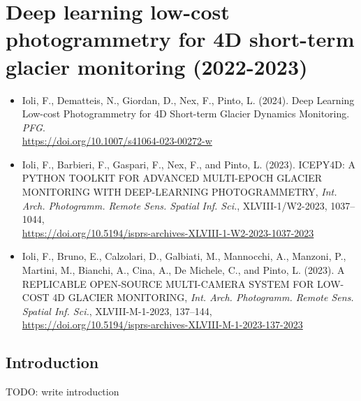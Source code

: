 \graphicspath{{figures/chapter4/}}
\onehalfspacing

\chapter{Deep learning low-cost photogrammetry for 4D short-term glacier monitoring
  (2022-2023)}

\vfill


\begin{itemize}
  \item Ioli, F., Dematteis, N., Giordan, D., Nex, F., Pinto, L. (2024). Deep Learning Low-cost Photogrammetry for 4D Short-term Glacier Dynamics Monitoring. \textit{PFG}. 
  \\\url{https://doi.org/10.1007/s41064-023-00272-w}
  \item Ioli, F., Barbieri, F., Gaspari, F., Nex, F., and Pinto, L. (2023). ICEPY4D: A PYTHON TOOLKIT FOR ADVANCED MULTI-EPOCH GLACIER MONITORING WITH DEEP-LEARNING PHOTOGRAMMETRY, \textit{Int. Arch. Photogramm. Remote Sens. Spatial Inf. Sci.}, XLVIII-1/W2-2023, 1037–1044, 
  \\ \url{https://doi.org/10.5194/isprs-archives-XLVIII-1-W2-2023-1037-2023}
  \item Ioli, F., Bruno, E., Calzolari, D., Galbiati, M., Mannocchi, A., Manzoni, P.,
        Martini, M., Bianchi, A., Cina, A., De Michele, C., and Pinto, L. (2023). A
        REPLICABLE OPEN-SOURCE MULTI-CAMERA SYSTEM FOR LOW-COST 4D GLACIER MONITORING, \textit{Int. Arch. Photogramm. Remote Sens. Spatial Inf. Sci.}, XLVIII-M-1-2023, 137–144, \\
        \url{https://doi.org/10.5194/isprs-archives-XLVIII-M-1-2023-137-2023}
\end{itemize}

\newpage

\section{Introduction}\label{sec:4:introduction}

{\color{red} TODO: write introduction}

